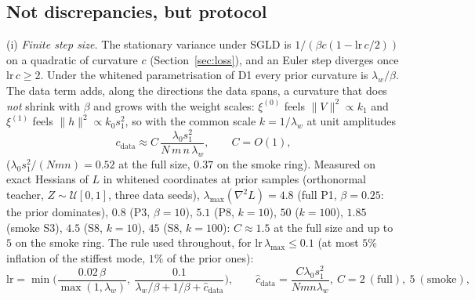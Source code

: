 \documentclass[11pt,a4paper]{article}
\begin{document}
\subsection{Not discrepancies, but protocol}
\label{sec:protocol}
(i) \emph{Finite step size.} The stationary variance under SGLD is $1/(\beta c(1 - \mathrm{lr}\,c/2))$ on a quadratic of curvature $c$ (Section~\ref{sec:loss}), and an Euler step diverges once $\mathrm{lr}\,c\ge2$. Under the whitened parametrisation of D1 every prior curvature is $\lambda_w/\beta$. The data term adds, along the directions the data spans, a curvature that does \emph{not} shrink with $\beta$ and grows with the weight scales: $\xi^{(0)}$ feels $\|V\|^2\propto k_1$ and $\xi^{(1)}$ feels $\|h\|^2\propto k_0s_1^2$, so with the common scale $k = 1/\lambda_w$ at unit amplitudes
\begin{equation}
  c_{\mathrm{data}}\approx C\,\frac{\lambda_0s_1^2}{N\,m\,n\,\lambda_w},\qquad C = O(1),
  \label{eq:cdata}
\end{equation}
($\lambda_0s_1^2/(Nmn) = 0.52$ at the full size, $0.37$ on the smoke ring). Measured on exact Hessians of $L$ in whitened coordinates at prior samples (orthonormal teacher, $Z\sim\mathcal U[0,1]$, three data seeds), $\lambda_{\max}(\nabla^2L) = 4.8$ (full P1, $\beta = 0.25$: the prior dominates), $0.8$ (P3, $\beta = 10$), $5.1$ (P8, $k = 10$), $50$ ($k = 100$), $1.85$ (smoke S3), $4.5$ (S8, $k = 10$), $45$ (S8, $k = 100$): $C\approx1.5$ at the full size and up to $5$ on the smoke ring. The rule used throughout, for $\mathrm{lr}\,\lambda_{\max}\le0.1$ (at most $5\%$ inflation of the stiffest mode, $1\%$ of the prior ones):
\begin{equation}
  \mathrm{lr} = \min\Big(\frac{0.02\,\beta}{\max(1,\lambda_w)},\ \frac{0.1}{\lambda_w/\beta + 1/\beta + \hat c_{\mathrm{data}}}\Big),\qquad
  \hat c_{\mathrm{data}} = \frac{C\lambda_0s_1^2}{Nmn\lambda_w},\ C = 2\ (\text{full}),\ 5\ (\text{smoke}),
  \label{eq:lr-rule}
\end{equation}
\end{document}
